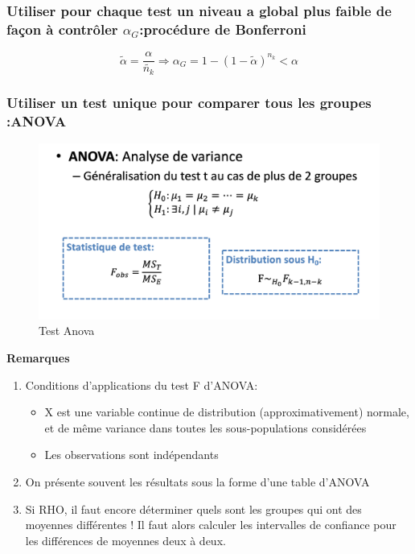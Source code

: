 \subsubsection{Utiliser pour chaque test un niveau a global plus faible de façon à contrôler $\alpha_{G}$:procédure de Bonferroni}
$$\tilde{\alpha}= \frac{\alpha}{\tilde{n_{k}}} \Rightarrow \alpha_{G}=1-(1-\tilde{\alpha})^{n_{k}} < \alpha$$

\subsubsection{Utiliser un test unique pour comparer tous les groupes :ANOVA}
\begin{figure}[H]
    \centering
    \includegraphics[scale=0.5]{images/anova.png}
    \caption{Test Anova}
    \label{fig:anova}
\end{figure}

\textbf{Remarques}
\begin{enumerate}
    \item Conditions d’applications du test F d’ANOVA:
    \begin{itemize}
        \item X est une variable continue de distribution (approximativement) normale, et de même variance dans toutes les sous-populations considérées
        \item Les observations sont indépendants
    \end{itemize}
    \item On présente souvent les résultats sous la forme d’une table d’ANOVA
    \item Si RHO, il faut encore déterminer quels sont les groupes qui ont des moyennes différentes ! Il faut alors calculer les intervalles de confiance pour les différences de moyennes deux à deux.
\end{enumerate}

